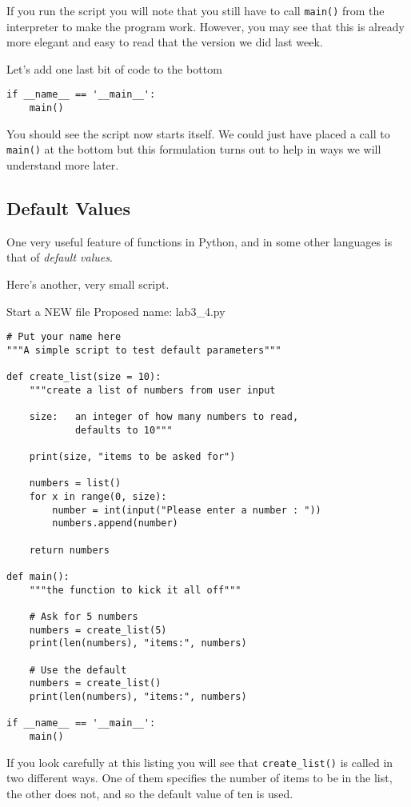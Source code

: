 \documentclass[12pt,oneside]{cttutorial}
\begin{document}
If you run the script you will note that you still have to call \lstinline!main()! from the interpreter to make the program work. However, you may see that this is already more elegant and easy to read that the version we did last week.

Let's add one last bit of code to the bottom

\begin{lstlisting}
if __name__ == '__main__':
    main()
\end{lstlisting}

You should see the script now starts itself. We could just have placed a call to \lstinline!main()! at the bottom but this formulation turns out to help in ways we will understand more later.

\subsection{Default Values}

One very useful feature of functions in Python, and in some other languages is that of \emph{default values}.

Here's another, very small script.

\alert{Start a NEW file}
Proposed name: lab3\_4.py
\begin{lstlisting}
# Put your name here
"""A simple script to test default parameters"""

def create_list(size = 10):
    """create a list of numbers from user input

    size:   an integer of how many numbers to read,
            defaults to 10"""

    print(size, "items to be asked for")
    
    numbers = list()
    for x in range(0, size):
        number = int(input("Please enter a number : "))
        numbers.append(number)

    return numbers

def main():
    """the function to kick it all off"""

    # Ask for 5 numbers
    numbers = create_list(5)
    print(len(numbers), "items:", numbers)

    # Use the default
    numbers = create_list()
    print(len(numbers), "items:", numbers)

if __name__ == '__main__':
    main()
\end{lstlisting}

If you look carefully at this listing you will see that \lstinline!create_list()! is called in two different ways. One of them specifies the number of items to be in the list, the other does not, and so the default value of ten is used.
\end{document}
